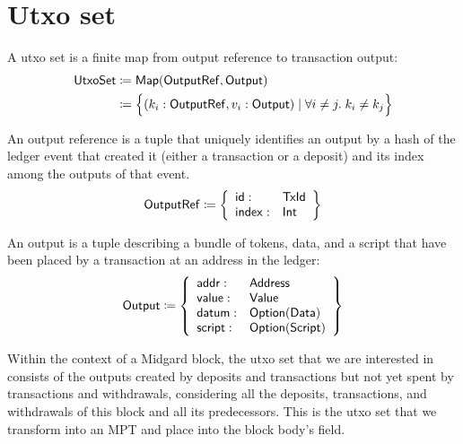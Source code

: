 \documentclass[../midgard.tex]{subfiles}
\begin{document}
\section{Utxo set}
\label{h:utxo-set}

A utxo set is a finite map from output reference to transaction output:
\begin{align*}
    \mathsf{UtxoSet} &\coloneq \mathsf{Map(OutputRef, Output)} \\
      &\coloneq \Bigl\{
        (k_i: \mathsf{OutputRef}, v_i: \mathsf{Output}) \mid \forall i \neq j.\; k_i \neq k_j
    \Bigr\}
\end{align*}

An output reference is a tuple that uniquely identifies an output by a hash of the ledger event that created it (either a transaction or a deposit) and its index among the outputs of that event.
\begin{equation*}
    \mathsf{OutputRef} \coloneq \left\{
    \begin{array}{ll}
        \mathsf{id} : & \mathsf{TxId} \\
        \mathsf{index} : & \mathsf{Int}
    \end{array} \right\}
\end{equation*}

An output is a tuple describing a bundle of tokens, data, and a script that have been placed by a transaction at an address in the ledger:
\begin{equation*}
    \mathsf{Output} \coloneq \left\{
    \begin{array}{ll}
        \mathsf{addr} : & \mathsf{Address} \\
        \mathsf{value} : & \mathsf{Value} \\
        \mathsf{datum} : & \mathsf{Option(Data)} \\
        \mathsf{script} : & \mathsf{Option(Script)}
    \end{array} \right\}
\end{equation*}

Within the context of a Midgard block, the utxo set that we are interested in consists of the outputs created by deposits and transactions but not yet spent by transactions and withdrawals, considering all the deposits, transactions, and withdrawals of this block and all its predecessors.
This is the utxo set that we transform into an MPT and place into the block body's  field.


\todo

\todo

\todo
\end{document}

